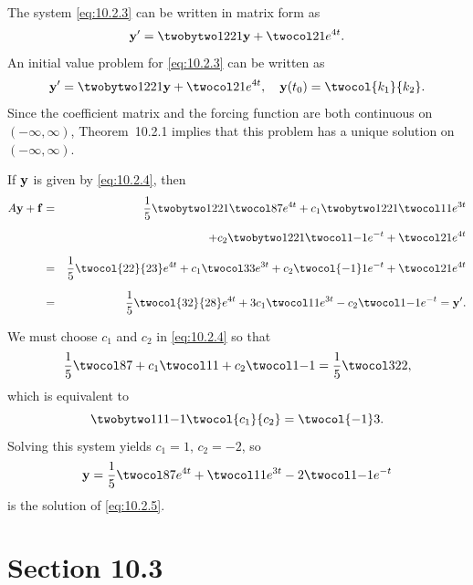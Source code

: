 \begin{examplesolution}
 The system \eqref{eq:10.2.3} can be written in matrix form as
\[
  {\bf y}'=\twobytwo1221{\bf y}+\twocol21e^{4t}.
\]
An initial value problem for \eqref{eq:10.2.3} can be written as
\[
  {\bf y}'=\twobytwo1221{\bf y}+\twocol21e^{4t},\quad {\bf y}(t_{0})=\twocol{k_{1}}{k_{2}}.
\]
Since the coefficient matrix and the forcing function are both continuous on $(-\infty,\infty)$,
Theorem~10.2.1 implies that this problem has a unique solution on $(-\infty,\infty)$.

 If ${\bf y}$ is given by \eqref{eq:10.2.4}, then
\begin{eqnarray*}
  A{\bf y}+{\bf f} & = & \frac{1}{5}\twobytwo1221\twocol87e^{4t}+c_{1}\twobytwo1221\twocol11e^{3t}                     \\[2\jot]
                   &   & +c_{2}\twobytwo1221\twocol1{-1}e^{-t}+\twocol21e^{4t}                                         \\[2\jot]
                   & = & \frac{1}{5}\twocol{22}{23}e^{4t}+c_{1}\twocol33e^{3t}+c_{2}\twocol{-1}1e^{-t}+\twocol21e^{4t} \\[2\jot]
                   & = & \frac{1}{5}\twocol{32}{28}e^{4t}+3c_{1}\twocol11e^{3t}-c_{2}\twocol1{-1}e^{-t}={\bf y}'.
\end{eqnarray*}

 We must choose $c_{1}$ and $c_{2}$ in \eqref{eq:10.2.4} so that
\[
  \frac{1}{5}\twocol87+c_{1}\twocol11+c_{2}\twocol1{-1}=\frac{1}{5}\twocol3{22},
\]
which is equivalent to
\[
  \twobytwo111{-1}\twocol{c_{1}}{c_{2}}=\twocol{-1}3.
\]
Solving this system yields $c_{1}=1$, $c_{2}=-2$, so
\[
  {\bf y}=\frac{1}{5}\twocol87e^{4t}+\twocol11e^{3t}-2\twocol1{-1}e^{-t}
\]
is the solution of \eqref{eq:10.2.5}.
\end{examplesolution}

\section*{Section 10.3}
\setcounter{chapter}{10}
\setcounter{section}{3}

